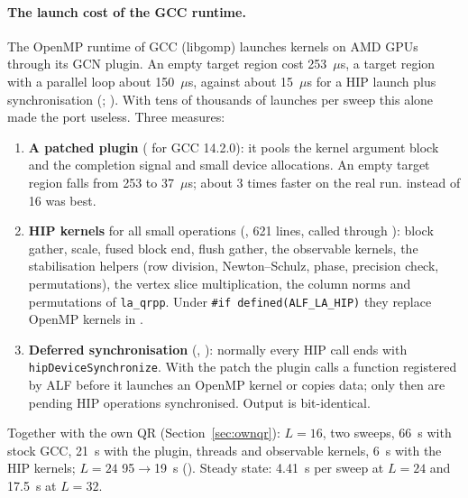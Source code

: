 \paragraph{The launch cost of the GCC runtime.} The OpenMP runtime of GCC (libgomp) launches kernels on AMD GPUs through its GCN plugin. An empty target region cost 253~$\mu$s, a target region with a parallel loop about 150~$\mu$s, against about 15~$\mu$s for a HIP launch plus synchronisation (; ). %
With tens of thousands of launches per sweep this alone made the port useless. Three measures:
\begin{enumerate}
\item \textbf{A patched plugin} ( for GCC 14.2.0): it pools the kernel argument block and the completion signal and small device allocations. An empty target region falls from 253 to 37~$\mu$s; about 3 times faster on the real run.  instead of 16 was best.
\item \textbf{HIP kernels} for all small operations (, 621 lines, called through ): block gather, scale, fused block end, flush gather, the observable kernels, the stabilisation helpers (row division, Newton--Schulz, phase, precision check, permutations), the vertex slice multiplication, the column norms and permutations of \texttt{la\_qrpp}. Under \texttt{\#if defined(ALF\_LA\_HIP)} they replace OpenMP kernels in .
\item \textbf{Deferred synchronisation} (, ): normally every HIP call ends with \texttt{hipDeviceSynchronize}. With the patch the plugin calls a function registered by ALF before it launches an OpenMP kernel or copies data; only then are pending HIP operations synchronised. Output is bit-identical.
\end{enumerate}
Together with the own QR (Section~\ref{sec:ownqr}): $L=16$, two sweeps, 66~s with stock GCC, 21~s with the plugin, threads and observable kernels, 6~s with the HIP kernels; $L=24$ 95$\to$19~s (). Steady state: 4.41~s per sweep at $L=24$ and 17.5~s at $L=32$. %


